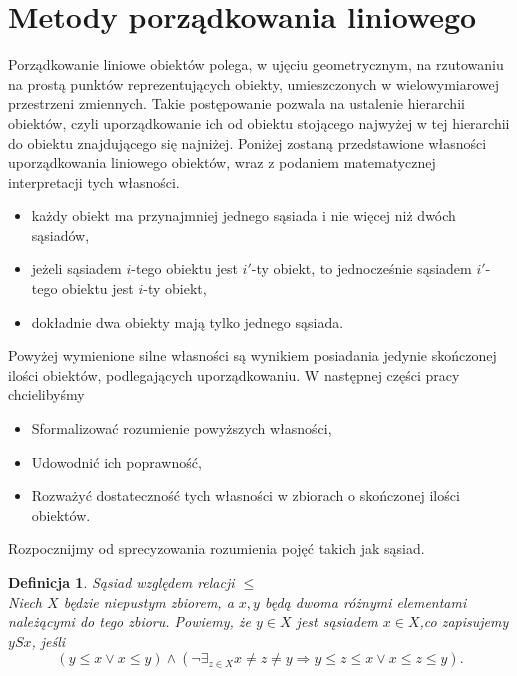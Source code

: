 \documentclass[12pt,a4paper]{report}
\newtheorem{definition}[theorem]{Definicja}
\begin{document}
\section{Metody porządkowania liniowego}
\noindent

Porządkowanie liniowe obiektów polega, w ujęciu geometrycznym, na rzutowaniu na prostą punktów reprezentujących obiekty, umieszczonych w wielowymiarowej przestrzeni zmiennych. Takie postępowanie pozwala na ustalenie hierarchii obiektów, czyli uporządkowanie ich od obiektu stojącego najwyżej w tej hierarchii do obiektu znajdującego się najniżej. Poniżej zostaną przedstawione własności uporządkowania liniowego obiektów, wraz z podaniem matematycznej interpretacji tych własności.\\

\begin{itemize}
\item każdy obiekt ma przynajmniej jednego sąsiada i nie więcej niż dwóch sąsiadów,
\item jeżeli sąsiadem $i$-tego obiektu jest $i'$-ty obiekt, to jednocześnie sąsiadem $i'$-tego obiektu jest $i$-ty obiekt,
\item dokładnie dwa obiekty mają tylko jednego sąsiada.\\
\end{itemize}
\noindent

Powyżej wymienione silne własności są wynikiem posiadania jedynie skończonej ilości obiektów, podlegających uporządkowaniu. W następnej części pracy chcielibyśmy 
\begin{itemize}
\item Sformalizować rozumienie powyższych własności,
\item Udowodnić ich poprawność,
\item Rozważyć dostateczność tych własności w zbiorach o skończonej ilości obiektów.
\end{itemize}

Rozpocznijmy od sprecyzowania rozumienia pojęć takich jak sąsiad.

\begin{definition}{Sąsiad względem relacji $\leq$\\ }
Niech  $X$ będzie niepustym zbiorem, a $x, y$ będą dwoma różnymi elementami należącymi do tego zbioru. Powiemy, że $y \in X$ jest sąsiadem $x \in X$,co zapisujemy $ySx$, jeśli
$$
\left( y \leq x \lor x \leq y \right) \land \left(  \lnot \exists_{z \in X} x \neq z \neq y \Rightarrow y \leq z \leq x \lor x \leq z \leq y \right).
$$
\end{definition}
\end{document}
